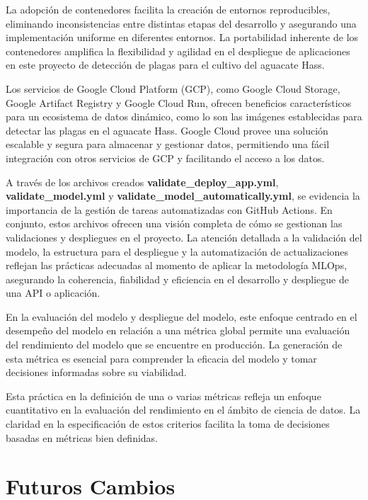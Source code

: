 La adopción de contenedores facilita la creación de entornos reproducibles, eliminando inconsistencias entre distintas etapas del desarrollo y asegurando una implementación uniforme en diferentes entornos. La portabilidad inherente de los contenedores amplifica la flexibilidad y agilidad en el despliegue de aplicaciones en este proyecto de detección de plagas para el cultivo del aguacate Hass.

Los servicios de Google Cloud Platform (GCP), como Google Cloud Storage, Google Artifact Registry y Google Cloud Run, ofrecen beneficios característicos para un ecosistema de datos dinámico, como lo son las imágenes establecidas para detectar las plagas en el aguacate Hass. Google Cloud provee una solución escalable y segura para almacenar y gestionar datos, permitiendo una fácil integración con otros servicios de GCP y facilitando el acceso a los datos. 

A través de los archivos creados \textbf{validate\_deploy\_app.yml}, \textbf{validate\_model.yml} y \textbf{validate\_model\_automatically.yml}, se evidencia la importancia de la gestión de tareas automatizadas con GitHub Actions. En conjunto, estos archivos ofrecen una visión completa de cómo se gestionan las validaciones y despliegues en el proyecto. La atención detallada a la validación del modelo, la estructura para el despliegue y la automatización de actualizaciones reflejan las prácticas adecuadas al momento de aplicar la metodología MLOps, asegurando la coherencia, fiabilidad y eficiencia en el desarrollo y despliegue de una API o aplicación.

En la evaluación del modelo y despliegue del modelo, este enfoque centrado en el desempeño del modelo en relación a una métrica global permite una evaluación del rendimiento del modelo que se encuentre en producción. La generación de esta métrica es esencial para comprender la eficacia del modelo y tomar decisiones informadas sobre su viabilidad. 

\newpage

Esta práctica en la definición de una o varias métricas refleja un enfoque cuantitativo en la evaluación del rendimiento en el ámbito de ciencia de datos. La claridad en la especificación de estos criterios facilita la toma de decisiones basadas en métricas bien definidas.


\section{Futuros Cambios}

